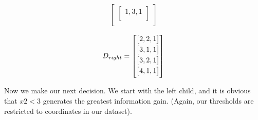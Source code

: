 \documentclass{article}
\begin{document}
\begin{center}
\begin{minipage}[t]{.5\textwidth}
\begin{gather*}
\begin{bmatrix}
\begin{bmatrix}
             1,3,1 \\
             \end{bmatrix} \\
             \end{bmatrix}
\end{gather*}
\end{minipage}%
\noindent\begin{minipage}[t]{.5\textwidth}
\begin{gather*}
            D_{right} = 
        \begin{bmatrix}
        \vspace{1mm}
         \begin{bmatrix}
         2,2,1 \\ 
         \end{bmatrix} \\
        \vspace{1mm}
         \begin{bmatrix}
         3,1,1 \\ 
         \end{bmatrix} \\
        \vspace{1mm}
         \begin{bmatrix}
         3,2,1 \\
        \end{bmatrix} \\
        \vspace{1mm}
         \begin{bmatrix}
         4,1,1 \\
        \end{bmatrix} \\
         \end{bmatrix}
\end{gather*}
\end{minipage}%
\end{center}
Now we make our next decision. We start with the left child, and it is obvious that $x2<3$ generates the greatest information gain. (Again, our thresholds are restricted to coordinates in our dataset).
\begin{center}
\end{center}
\end{document}
